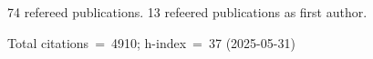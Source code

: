 74 refereed publications. 13 refeered publications as first author.

Total citations~=~4910; h-index~=~37 (2025-05-31)
